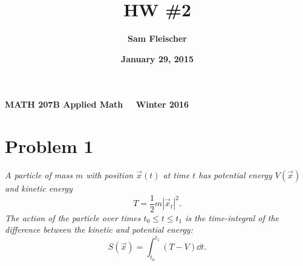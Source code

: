 \documentclass[12pt]{article}
\title{\bf HW \#2}
\author{\bf Sam Fleischer}
\date{\bf January 29, 2015}
\theoremstyle{plain}
\begin{document}
\textbf{MATH 207B \hfill Applied Math \ \ \hfill Winter 2016\ \ \ }

{\let\newpage\relax\maketitle}

\section*{Problem 1}
\emph{A particle of mass $m$ with position $\vec{x}(t)$ at time $t$ has potential energy $V(\vec{x})$ and kinetic energy $$T = \frac{1}{2}m|\vec{x}_t|^2.$$  The action of the particle over times $t_0 \leq t \leq t_1$ is the time-integral of the difference between the kinetic and potential energy: $$S(\vec{x}) = \int_{t_0}^{t_1}(T - V)\dd t.$$}
\end{document}
